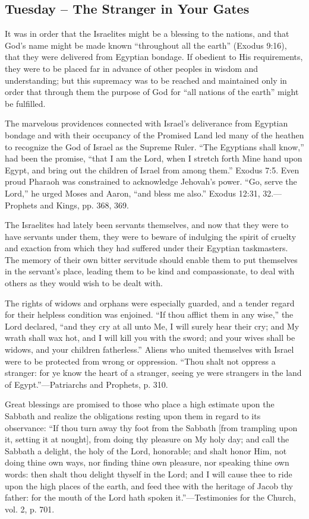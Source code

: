 \documentclass[a4paper, 10pt, twoside, headings=small]{scrartcl}
\begin{document}
\begin{multicols}{2}
\section*{Tuesday – The Stranger in Your Gates}

It was in order that the Israelites might be a blessing to the nations, and that God’s name might be made known “throughout all the earth” (Exodus 9:16), that they were delivered from Egyptian bondage. If obedient to His requirements, they were to be placed far in advance of other peoples in wisdom and understanding; but this supremacy was to be reached and maintained only in order that through them the purpose of God for “all nations of the earth” might be fulfilled.

The marvelous providences connected with Israel’s deliverance from Egyptian bondage and with their occupancy of the Promised Land led many of the heathen to recognize the God of Israel as the Supreme Ruler. “The Egyptians shall know,” had been the promise, “that I am the Lord, when I stretch forth Mine hand upon Egypt, and bring out the children of Israel from among them.” Exodus 7:5. Even proud Pharaoh was constrained to acknowledge Jehovah’s power. “Go, serve the Lord,” he urged Moses and Aaron, “and bless me also.” Exodus 12:31, 32.—Prophets and Kings, pp. 368, 369.

The Israelites had lately been servants themselves, and now that they were to have servants under them, they were to beware of indulging the spirit of cruelty and exaction from which they had suffered under their Egyptian taskmasters. The memory of their own bitter servitude should enable them to put themselves in the servant’s place, leading them to be kind and compassionate, to deal with others as they would wish to be dealt with.

The rights of widows and orphans were especially guarded, and a tender regard for their helpless condition was enjoined. “If thou afflict them in any wise,” the Lord declared, “and they cry at all unto Me, I will surely hear their cry; and My wrath shall wax hot, and I will kill you with the sword; and your wives shall be widows, and your children fatherless.” Aliens who united themselves with Israel were to be protected from wrong or oppression. “Thou shalt not oppress a stranger: for ye know the heart of a stranger, seeing ye were strangers in the land of Egypt.”—Patriarchs and Prophets, p. 310.

Great blessings are promised to those who place a high estimate upon the Sabbath and realize the obligations resting upon them in regard to its observance: “If thou turn away thy foot from the Sabbath [from trampling upon it, setting it at nought], from doing thy pleasure on My holy day; and call the Sabbath a delight, the holy of the Lord, honorable; and shalt honor Him, not doing thine own ways, nor finding thine own pleasure, nor speaking thine own words: then shalt thou delight thyself in the Lord; and I will cause thee to ride upon the high places of the earth, and feed thee with the heritage of Jacob thy father: for the mouth of the Lord hath spoken it.”—Testimonies for the Church, vol. 2, p. 701.


\end{multicols}
\end{document}
